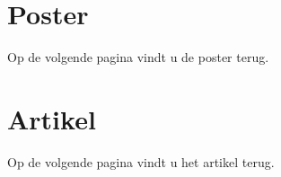 \chapter{Poster}
\label{app:b}
Op de volgende pagina vindt u de poster terug.

\newpage


\chapter{Artikel}

Op de volgende pagina vindt u het artikel terug.

\newpage


